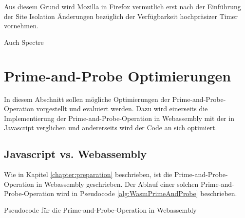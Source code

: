 Aus diesem Grund wird Mozilla in Firefox vermutlich erst nach der Einführung der Site Isolation Änderungen bezüglich der Verfügbarkeit hochpräsizer Timer vornehmen.



Auch Spectre



\section{Prime-and-Probe Optimierungen}

In diesem Abschnitt sollen mögliche Optimierungen der Prime-and-Probe-Operation vorgestellt und evaluiert werden. Dazu wird einerseits die Implementierung der Prime-and-Probe-Operation in Webassembly mit der in Javascript verglichen und andererseits wird der Code an sich optimiert.

\subsection{Javascript vs. Webassembly}
\label{JavascriptVSWasm}

Wie in Kapitel \ref{chapter:preparation} beschrieben, ist die Prime-and-Probe-Operation in Webassembly geschrieben.
Der Ablauf einer solchen Prime-and-Probe-Operation wird in Pseudocode \ref{alg:WasmPrimeAndProbe} beschrieben.

\begin{algorithm}[h]
\DontPrintSemicolon
\caption{Pseudocode für die Prime-and-Probe-Operation in Webassembly}
\label{alg:WasmPrimeAndProbe}

\end{algorithm}

